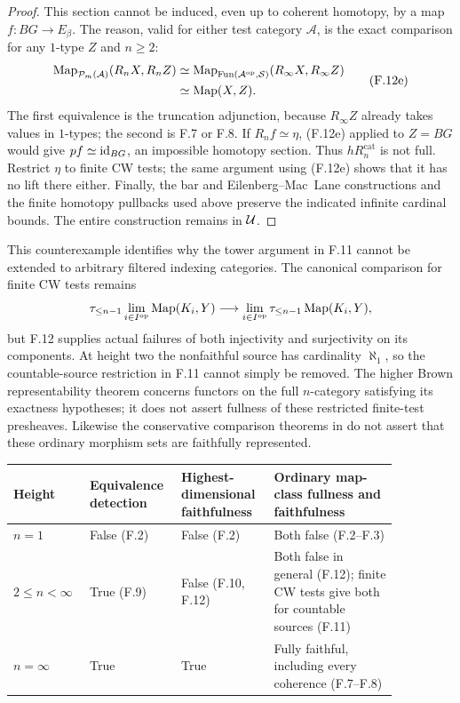 \begin{proof}
This section cannot be induced, even up to coherent homotopy,
by a map $f:BG\to E_\beta$. The reason, valid for either test
category $\mathcal A$, is the exact comparison for any $1$-type
$Z$ and $n\geq2$:
\[
\begin{split}
 \operatorname{Map}_{\mathcal P_m(\mathcal A)}(R_nX,R_nZ)
 &\simeq
 \operatorname{Map}_{\operatorname{Fun}(\mathcal A^{\mathrm{op}},\mathcal S)}
                 (R_\infty X,R_\infty Z)\\
 &\simeq\operatorname{Map}(X,Z).
\end{split}
 \tag{F.12e}
\]
The first equivalence is the truncation adjunction, because
$R_\infty Z$ already takes values in $1$-types; the second
is F.7 or F.8. If $R_nf\simeq\eta$, (F.12e) applied to
$Z=BG$ would give $pf\simeq\mathrm{id}_{BG}$, an impossible homotopy
section. Thus $hR_n^{\mathrm{cat}}$ is not full. Restrict
$\eta$ to finite CW tests; the same argument using (F.12e)
shows that it has no lift there either. Finally, the bar and
Eilenberg--Mac~Lane constructions and the finite homotopy
pullbacks used above preserve the indicated infinite cardinal
bounds. The entire construction remains in $\mathcal U$.
\end{proof}

This counterexample identifies why the tower argument in F.11 cannot
be extended to arbitrary filtered indexing categories. The canonical
comparison for finite CW tests remains
\[
 \tau_{\leq n-1}\lim_{i\in I^{\mathrm{op}}}\operatorname{Map}(K_i,Y)
   \longrightarrow
 \lim_{i\in I^{\mathrm{op}}}\tau_{\leq n-1}\operatorname{Map}(K_i,Y),
\]
but F.12 supplies actual failures of both injectivity and surjectivity
on its components. At height two the nonfaithful source has cardinality
$\aleph_1$, so the countable-source restriction in F.11 cannot simply
be removed. The higher Brown representability theorem
\citep[Theorem~4.2.11]{NguyenRaptisSchrade2022} concerns functors
on the full $n$-category satisfying its exactness hypotheses; it
does not assert fullness of these restricted finite-test presheaves.
Likewise the conservative comparison theorems in
\citet[Theorems~35 and~37]{Arlin2020} do not assert that these
ordinary morphism sets are faithfully represented.

\begin{center}
\begin{tabular}{L{0.16\linewidth}L{0.18\linewidth}L{0.22\linewidth}L{0.30\linewidth}}
\hline
Height & Equivalence detection & Highest-dimensional faithfulness & Ordinary map-class fullness and faithfulness\\
\hline
$n=1$ & False (F.2) & False (F.2) & Both false (F.2--F.3)\\
$2\leq n<\infty$ & True (F.9) & False (F.10, F.12) & Both false in general (F.12); finite CW tests give both for countable sources (F.11)\\
$n=\infty$ & True & True & Fully faithful, including every coherence (F.7--F.8)\\
\hline
\end{tabular}
\end{center}

